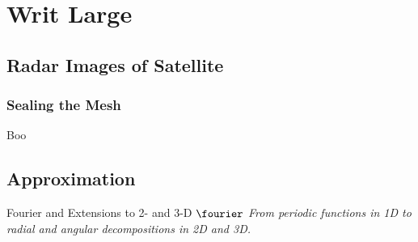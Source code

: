 % 

\section{Writ Large}

\subsection{Radar Images of Satellite}
\begin{frame}\frametitle{Sealing the Mesh}
Boo
\end{frame}


\subsection{Approximation}
\begin{frame}{Fourier and Extensions to 2- and 3-D}
    \centering
    $\fourier$
    \vspace{1em}
    \textit{From periodic functions in 1D to radial and angular decompositions in 2D and 3D.}
\end{frame}
	
